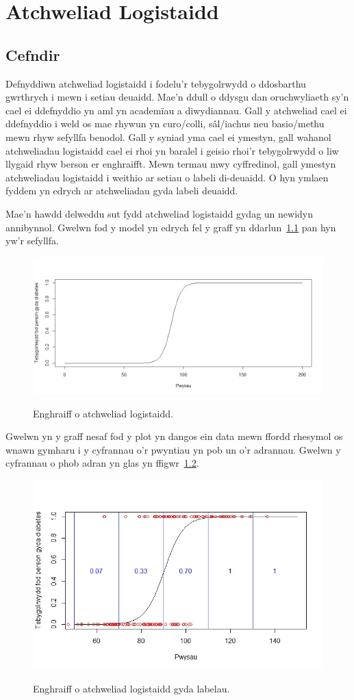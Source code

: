 \chapter{Atchweliad Logistaidd}\label{cha:Atchweliad_logistaidd}
\section{Cefndir}
Defnyddiwn atchweliad logistaidd i fodelu'r tebygolrwydd o ddosbarthu gwrthrych i mewn i setiau deuaidd. Mae'n ddull o ddysgu dan oruchwyliaeth sy'n cael ei ddefnyddio yn aml yn academ\"{i}au a diwydiannau. Gall y atchweliad cael ei ddefnyddio i weld os mae rhywun yn curo/colli, s\^{a}l/iachus neu basio/methu mewn rhyw sefyllfa benodol. Gall y syniad yma cael ei ymestyn, gall wahanol atchweliadau logistaidd cael ei rhoi yn baralel i geisio rhoi'r tebygolrwydd o liw llygaid rhyw berson er enghraifft. Mewn termau mwy cyffredinol, gall ymestyn atchweliadau logistaidd i weithio ar setiau o labeli di-deuaidd. O hyn ymlaen fyddem yn edrych ar atchweliadau gyda labeli deuaidd. 

Mae'n hawdd delweddu sut fydd atchweliad logistaidd gydag un newidyn annibynnol. Gwelwn fod y model yn edrych fel y graff yn ddarlun~\ref{fig:Enghraifft_o_atchweliad_logistaidd} pan hyn yw'r sefyllfa.

\begin{figure}[H]
\begin{center}
\includegraphics[width=0.5\linewidth]{../img/Atchweliad_logistaidd.jpeg}
\label{fig:Enghraifft_o_atchweliad_logistaidd}
\caption{Enghraiff o atchweliad logistaidd.}
\end{center}
\end{figure}

Gwelwn yn y graff nesaf fod y plot yn dangos ein data mewn ffordd rhesymol os wnawn gymharu i y cyfrannau o'r pwyntiau yn pob un o'r adrannau. Gwelwn y cyfrannau o phob adran yn glas yn ffigwr~\ref{fig:Enghraifft_o_atchweliad_logistaidd_pwyntiau}. 

\begin{figure}[H]
\begin{center}
\includegraphics[width=0.5\linewidth]{../img/atchweliad_logistaidd_gyda_pwyntiau.jpeg}
\label{fig:Enghraifft_o_atchweliad_logistaidd_pwyntiau}
\caption{Enghraiff o atchweliad logistaidd gyda labelau.}
\end{center}
\end{figure}


